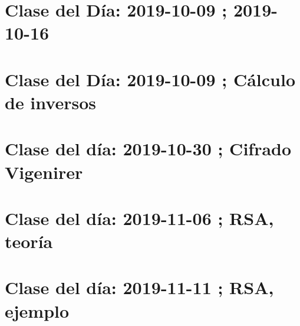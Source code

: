 \documentclass[openany]{book}
\begin{document}
\chapter{Clase del Día: 2019-10-09 ; 2019-10-16 }


\chapter{Clase del Día: 2019-10-09 ; Cálculo de inversos}


\chapter{Clase del día: 2019-10-30 ; Cifrado Vigenirer}


\chapter{Clase del día: 2019-11-06 ; RSA, teoría}


\chapter{Clase del día: 2019-11-11 ; RSA, ejemplo}

\end{document}
